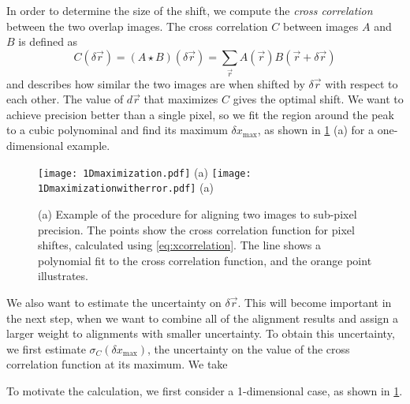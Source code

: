 \documentclass{article}
\begin{document}
In order to determine the size of the shift, we compute the \emph{cross correlation} between the two overlap images.  The cross correlation $C$ between images $A$ and $B$ is defined as
\begin{equation}
C(\delta\vec{r})=(A\star B)(\delta\vec{r})=\sum_{\vec{r}} {A(\vec{r})B(\vec{r}+\delta\vec{r})}
\label{eq:xcorrelation}
\end{equation}
and describes how similar the two images are when shifted by $\delta\vec{r}$ with respect to each other.  The value of $d\vec{r}$ that maximizes $C$ gives the optimal shift.  We want to achieve precision better than a single pixel, so we fit the region around the peak to a cubic polynominal and find its maximum $\delta x_\text{max}$, as shown in \cref{fig:1Dmaximization} (a) for a one-dimensional example.

\begin{figure}[ht]
	\centering
	\begin{multicols}{2}
	\texttt{[image: 1Dmaximization.pdf]} (a)
	\texttt{[image: 1Dmaximizationwitherror.pdf]} (a)
	\end{multicols}
	\caption{(a) Example of the procedure for aligning two images to sub-pixel precision.  The points show the cross correlation function for pixel shiftes, calculated using \cref{eq:xcorrelation}.  The line shows a polynomial fit to the cross correlation function, and the orange point illustrates.}
	\label{fig:1Dmaximization}
\end{figure}


We also want to estimate the uncertainty on $\delta\vec{r}$.  This will become important in the next step, when we want to combine all of the alignment results and assign a larger weight to alignments with smaller uncertainty.  To obtain this uncertainty, we first estimate $\sigma_C(\delta x_\text{max})$, the uncertainty on the value of the cross correlation function at its maximum.  We take 

To motivate the calculation, we first consider a 1-dimensional case, as shown in \cref{fig:1Dmaximization}.
\end{document}
